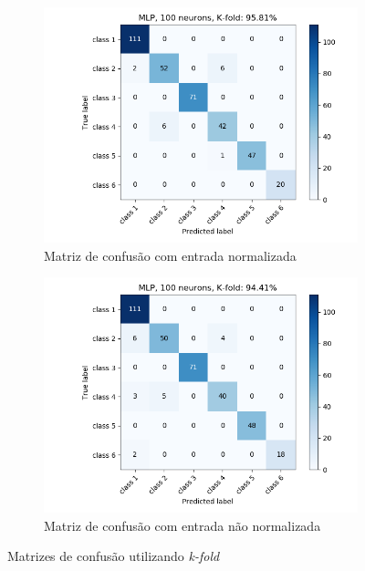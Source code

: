 \documentclass[paper=a4, fontsize=11pt]{scrartcl}
\numberwithin{equation}{section}		%
\numberwithin{figure}{section}			%
\numberwithin{table}{section}				%
\begin{document}
	\begin{figure}[h!]
		\begin{subfigure}{.5\textwidth}
			\centering
			\includegraphics[width=\linewidth]{img/q3_mlp_kfold_norm.png}
			\caption{Matriz de confusão com entrada normalizada}
			\label{fig:q3loonorm}
		\end{subfigure}%
		\begin{subfigure}{.5\textwidth}
			\centering
			\includegraphics[width=\linewidth]{img/q3_mlp_kfold_notNorm.png}
			\caption{Matriz de confusão com entrada não normalizada}
			\label{fig:q3loonotnorm}
		\end{subfigure}
		\caption{Matrizes de confusão utilizando \textit{k-fold}}
		\label{fig:MLP_confusao_kfold}
	\end{figure}
	
\end{document}
